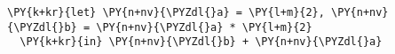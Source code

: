 \begin{Verbatim}[commandchars=\\\{\}]
\PY{k+kr}{let} \PY{n+nv}{\PYZdl{}a} = \PY{l+m}{2}, \PY{n+nv}{\PYZdl{}b} = \PY{n+nv}{\PYZdl{}a} * \PY{l+m}{2}
  \PY{k+kr}{in} \PY{n+nv}{\PYZdl{}b} + \PY{n+nv}{\PYZdl{}a}
\end{Verbatim}
